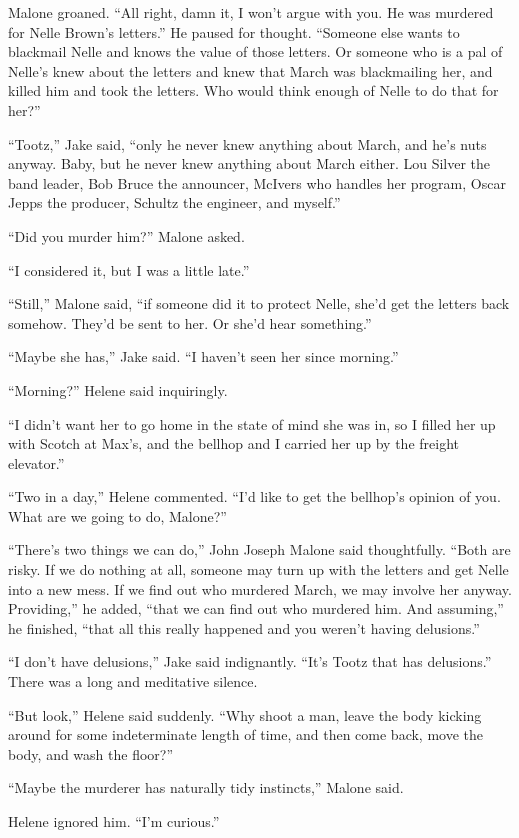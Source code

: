 \documentclass{novel}
\begin{document}
Malone groaned. “All right, damn it, I won’t argue with you. He was murdered for Nelle Brown’s letters.” He paused for thought. “Someone else wants to blackmail Nelle and knows the value of those letters. Or someone who is a pal of Nelle’s knew about the letters and knew that March was blackmailing her, and killed him and took the letters. Who would think enough of Nelle to do that for her?”

“Tootz,” Jake said, “only he never knew anything about March, and he’s nuts anyway. Baby, but he never knew anything about March either. Lou Silver the band leader, Bob Bruce the announcer, McIvers who handles her program, Oscar Jepps the producer, Schultz the engineer, and myself.”

“Did you murder him?” Malone asked.

“I considered it, but I was a little late.”

“Still,” Malone said, “if someone did it to protect Nelle, she’d get the letters back somehow. They’d be sent to her. Or she’d hear something.”

“Maybe she has,” Jake said. “I haven’t seen her since morning.”

“Morning?” Helene said inquiringly.

“I didn’t want her to go home in the state of mind she was in, so I filled her up with Scotch at Max’s, and the bellhop and I carried her up by the freight elevator.”

“Two in a day,” Helene commented. “I’d like to get the bellhop’s opinion of you. What are we going to do, Malone?”

“There’s two things we can do,” John Joseph Malone said thoughtfully. “Both are risky. If we do nothing at all, someone may turn up with the letters and get Nelle into a new mess. If we find out who murdered March, we may involve her anyway. Providing,” he added, “that we can find out who murdered him. And assuming,” he finished, “that all this really happened and you weren’t having delusions.”

“I don’t have delusions,” Jake said indignantly. “It’s Tootz that has delusions.” There was a long and meditative silence.

“But look,” Helene said suddenly. “Why shoot a man, leave the body kicking around for some indeterminate length of time, and then come back, move the body, and wash the floor?”

“Maybe the murderer has naturally tidy instincts,” Malone said.

Helene ignored him. “I’m curious.”
\end{document}

